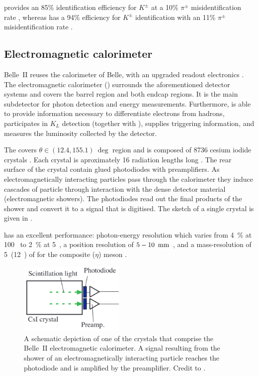 \TOP provides an 85\% identification efficiency for $K^{\pm}$ at a 10\% $\pi^{\pm}$ misidentification rate \cite{Kojima:2022qcl}, whereas
\ARICH has a 94\% efficiency for $K^{\pm}$ identification with an 11\% $\pi^{\pm}$ misidentification rate \cite{Yonenaga:2020eby}.

\subsection{Electromagnetic calorimeter}\label{sec:ecl}

Belle~II reuses the calorimeter of Belle, with an upgraded readout electronics \cite{Belle-II:2010dht}.
The electromagnetic calorimeter (\ECL) surrounds the aforementioned detector systems and covers the barrel region and both endcap regions.
It is the main subdetector for photon detection and energy measurements.
Furthermore, \ECL is able to provide information necessary to differentiate electrons from hadrons, participates in $K_L$ detection (together with \KLM),
supplies triggering information, and measures the luminosity collected by the detector.

The \ECL covers $\theta\in(12.4,155.1)~\deg$ region and is composed of 8736 cesium iodide crystals \cite{Miyabayashi:2020xzp}.
Each crystal is aproximately 16 radiation lengths long \cite{Aulchenko:2015nvy}.
The rear surface of the crystal contain glued photodiodes with preamplifiers.
As electromagnetically interacting particles pass through the calorimeter they induce cascades of particle through interaction with the dense detector material (electromagnetic showers).
The photodiodes read out the final products of the shower and convert it to a signal that is digitised.
The sketch of a single \ECL crystal is given in .

\ECL has an excellent performance: photon-energy resolution which varies from 4~\% at 100~\mev \cite{Miyabayashi:2020xzp} to 2~\% at 5~\gev \cite{Aulchenko:2015nvy},
a position resolution of $5-10~{\rm \,mm}$ \cite{Miyabayashi:2020xzp}, and a mass-resolution of 5~\mevcc(12~\mevcc) of for the composite \piz ($\eta$) meson \cite{Miyabayashi:2020xzp}.

\begin{figure}[htbp!]
    \centering
    \includegraphics[width=0.45\textwidth]{figures/experimental_setup/ecl.png}
    \caption{\label{fig:ecl}
    A schematic depiction of one of the crystals that comprise the Belle~II electromagnetic calorimeter.
    A signal resulting from the shower of an electromagnetically interacting particle reaches the photodiode and is amplified by the preamplifier.
    Credit to \cite{Miyabayashi:2020xzp}.
    }
\end{figure}


